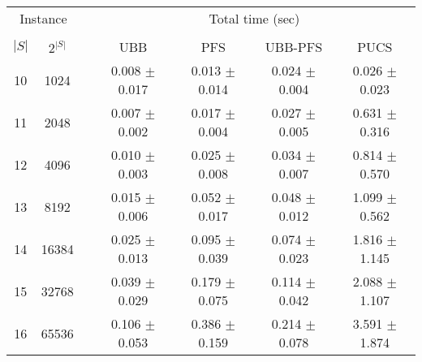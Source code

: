 \begin{table}
\centering
\footnotesize
\begin{tabular}{cc c cccc}
\toprule
\multicolumn{2}{c}{Instance} & \phantom{} & \multicolumn{4}{c}{Total time (sec)} \\
\cline{1-2}\cline{4-7}\\
$|S|$ & $2^{|S|}$ && UBB & PFS & UBB-PFS & PUCS \\
10 &    1024 &&  0.008 $\pm$ 0.017 & 0.013 $\pm$ 0.014 & 0.024 $\pm$ 0.004 & 0.026 $\pm$ 0.023 \\
11 &    2048 &&  0.007 $\pm$ 0.002 & 0.017 $\pm$ 0.004 & 0.027 $\pm$ 0.005 & 0.631 $\pm$ 0.316 \\
12 &    4096 &&  0.010 $\pm$ 0.003 & 0.025 $\pm$ 0.008 & 0.034 $\pm$ 0.007 & 0.814 $\pm$ 0.570 \\
13 &    8192 &&  0.015 $\pm$ 0.006 & 0.052 $\pm$ 0.017 & 0.048 $\pm$ 0.012 & 1.099 $\pm$ 0.562 \\
14 &   16384 &&  0.025 $\pm$ 0.013 & 0.095 $\pm$ 0.039 & 0.074 $\pm$ 0.023 & 1.816 $\pm$ 1.145 \\
15 &   32768 &&  0.039 $\pm$ 0.029 & 0.179 $\pm$ 0.075 & 0.114 $\pm$ 0.042 & 2.088 $\pm$ 1.107 \\
16 &   65536 &&  0.106 $\pm$ 0.053 & 0.386 $\pm$ 0.159 & 0.214 $\pm$ 0.078 & 3.591 $\pm$ 1.874 \\

\end{tabular}
\end{table}
